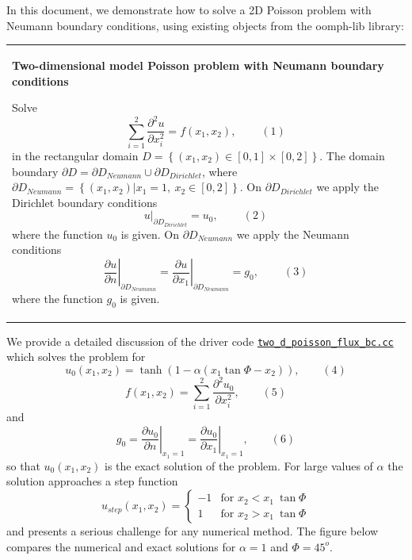 In this document, we demonstrate how to solve a 2D Poisson problem with Neumann boundary conditions, using existing objects from the {\ttfamily oomph-\/lib} library\+: \begin{center} \tabulinesep=1mm
\begin{longtabu} spread 0pt [c]{*{1}{|X[-1]}|}
\hline
\begin{center} {\bfseries Two-\/dimensional model Poisson problem with Neumann boundary conditions} \end{center}  Solve \[ \sum_{i=1}^2 \frac{\partial^2u}{\partial x_i^2} = f(x_1,x_2), \ \ \ \ \ \ \ \ \ \ (1) \] in the rectangular domain $ D = \left\{ (x_1,x_2) \in [0,1] \times [0,2]\right\} $. The domain boundary $ \partial D = \partial D_{Neumann} \cup \partial D_{Dirichlet} $, where $ \partial D_{Neumann} = \left\{ (x_1,x_2) | x_1=1, \ x_2\in [0,2] \right\} $. On $ \partial D_{Dirichlet} $ we apply the Dirichlet boundary conditions \[ \left. u\right|_{\partial D_{Dirichlet}}=u_0, \ \ \ \ \ \ \ \ \ \ (2) \] where the function $ u_0 $ is given. On $ \partial D_{Neumann} $ we apply the Neumann conditions \[ \left. \frac{\partial u}{\partial n}\right|_{\partial D_{Neumann}} = \left. \frac{\partial u}{\partial x_1}\right|_{\partial D_{Neumann}} =g_0, \ \ \ \ \ \ \ \ \ \ (3) \] where the function $ g_0 $ is given.   \\
\end{longtabu}
\end{center} 

We provide a detailed discussion of the driver code \href{../../../../demo_drivers/poisson/two_d_poisson_flux_bc/two_d_poisson_flux_bc.cc}{\tt two\+\_\+d\+\_\+poisson\+\_\+flux\+\_\+bc.\+cc} which solves the problem for \[ u_0(x_1,x_2) = \tanh(1-\alpha(x_1 \tan\Phi - x_2)), \ \ \ \ \ \ \ \ \ (4) \] \[ f(x_1,x_2) = \sum_{i=1}^2 \frac{\partial^2 u_0}{\partial x_i^2}, \ \ \ \ \ \ \ \ \ (5) \] and \[ g_0 = \left. \frac{\partial u_0}{\partial n} \right|_{x_1=1} = \left. \frac{\partial u_0}{\partial x_1} \right|_{x_1=1}, \ \ \ \ \ \ \ \ \ (6) \] so that $ u_0(x_1,x_2) $ is the exact solution of the problem. For large values of $ \alpha $ the solution approaches a step function \[ u_{step}(x_1,x_2) = \left\{ \begin{array}{rl} -1 & \mbox {for $x_2 < x_1 \ \tan\Phi$} \\ 1 & \mbox {for $x_2 > x_1 \ \tan\Phi$} \end{array} \right. \] and presents a serious challenge for any numerical method. The figure below compares the numerical and exact solutions for $ \alpha = 1 $ and $ \Phi = 45^o $.

